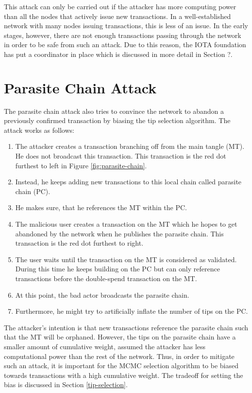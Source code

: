 This attack can only be carried out if the attacker has more computing power than all the nodes that actively issue new transactions. In a well-established network with many nodes issuing transactions, this is less of an issue. In the early stages, however, there are not enough transactions passing through the network in order to be safe from such an attack. Due to this reason, the IOTA foundation has put a coordinator in place which is discussed in more detail in Section ?.

\section{Parasite Chain Attack}
The parasite chain attack also tries to convince the network to abandon a previously confirmed transaction by biasing the tip selection algorithm. The attack works as follows:
\begin{enumerate}
    \item The attacker creates a transaction branching off from the main tangle (MT). He does not broadcast this transaction. This transaction is the red dot furthest to left in Figure \ref{fig:parasite-chain}.
    \item Instead, he keeps adding new transactions to this local chain called parasite chain (PC).
    \item He makes sure, that he references the MT within the PC.
    \item The malicious user creates a transaction on the MT which he hopes to get abandoned by the network when he publishes the parasite chain. This transaction is the red dot furthest to right.
    \item The user waits until the transaction on the MT is considered as validated. During this time he keeps building on the PC but can only reference transactions before the double-spend transaction on the MT.
    \item At this point, the bad actor broadcasts the parasite chain.
    \item Furthermore, he might try to artificially inflate the number of tips on the PC.
\end{enumerate}

The attacker's intention is that new transactions reference the parasite chain such that the MT will be orphaned. 
However, the tips on the parasite chain have a smaller amount of cumulative weight, assumed the attacker has less computational power than the rest of the network. 
Thus, in order to mitigate such an attack, it is important for the MCMC selection algorithm to be biased towards transactions with a high cumulative weight. The tradeoff for setting the bias is discussed in Section \ref{tip-selection}.

